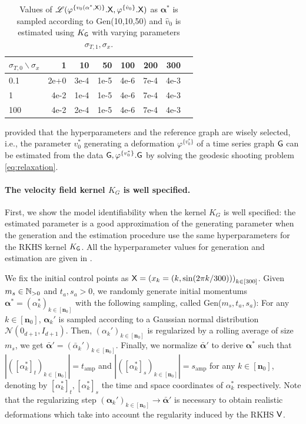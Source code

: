 \begin{table}
  \caption{Values of $\mathscr{L}(\varphi^{\{v_0(\mathbf{\alpha}^*,\mathsf{X})\}}.\mathsf{X},\varphi^{\{\hat{v}_0\}}.\mathsf{X})$ as $\mathbf{\alpha}^*$ is sampled according to Gen(10,10,50) and $\hat{v}_0$ is estimated using $K_{\mathsf{G}}$ with varying parameters $\sigma_{T,1},\sigma_x$.}
    \centering
       \begin{tabular}{lrrrrrrr}
       \toprule
       $\sigma_{T,0} \backslash \sigma_x$  & 1 & 10 & 50 & 100 & 200 & 300 \\
       \midrule
       0.1 & 2e+0 & 3e-4  & 1e-5&4e-6&7e-4&4e-3 \\
      1 & 4e-2 & 1e-4  & 1e-5&4e-6&7e-4 &4e-3  \\
       100 & 4e-2 & 2e-4  & 1e-5&4e-6&7e-4&4e-3  \\
       \bottomrule
       \end{tabular}
    \label{table:synthetic2}
\end{table}

provided that the hyperparameters and the reference graph are wisely selected, i.e., the parameter $v_0^*$ generating a deformation $\varphi^{\{v_0^*\}}$ of a time series graph $\mathsf{G}$ can be estimated from the data $\mathsf{G},\varphi^{\{v_0^*\}}.\mathsf{G}$ by solving the geodesic shooting problem \eqref{eq:relaxation}. 

\paragraph{The velocity field kernel $K_G$ is well specified.}

First, we show the model identifiability when the kernel $K_G$ is well specified: the estimated parameter is a good approximation of the generating parameter when the generation and the estimation procedure use the same hyperparameters for the RKHS kernel $K_{\mathsf{G}}$.
All the hyperparameter values for generation and estimation are given in .

We fix the initial control points as $\mathsf{X}=\left(x_k=(k,\sin(2\pi k/300))\right)_{k\in[300]} $.
Given $m_{s}\in \mathbb{N}_{>0}$ and $t_{a},s_{a}>0$, we randomly generate initial momentums $\mathbf{\alpha}^*=(\alpha_k^*)_{k\in[\mathbf{n}_0]}$ with the following sampling, called Gen($m_s,t_a,s_a$):
For any $k\in[\mathbf{n}_0]$, $\mathbf{\alpha}_k'$ is sampled according to a Gaussian normal distribution $\mathcal{N}(0_{d+1},I_{d+1})$.
Then, $(\alpha_k')_{k\in[\mathbf{n}_0]}$ is regularized by a rolling average of size $m_{s}$, we get $\bar{\mathbf{\alpha}}'=(\bar{\alpha}_k')_{k\in[\mathbf{n}_0]}$.
Finally, we normalize $\bar{\mathbf{\alpha}}'$ to derive $\mathbf{\alpha}^*$ such that $|([\alpha_k^*]_t)_{k\in[\mathbf{n}_0]}|=t_{\text{amp}}$ and $|([\alpha_k^*]_s)_{k\in[\mathbf{n}_0]}|=s_{\text{amp}}$ for any $k\in[\mathbf{n}_0]$, denoting by $[\alpha_k^*]_t,[\alpha_k^*]_s$ the time and space coordinates of $\alpha_k^*$ respectively.
Note that the regularizing step $(\mathbf{\alpha}_k')_{k\in[\mathbf{n}_0]}\to \bar{\mathbf{\alpha}}' $ is necessary to obtain realistic deformations which take into account the regularity induced by the RKHS $\mathsf{V}$.

